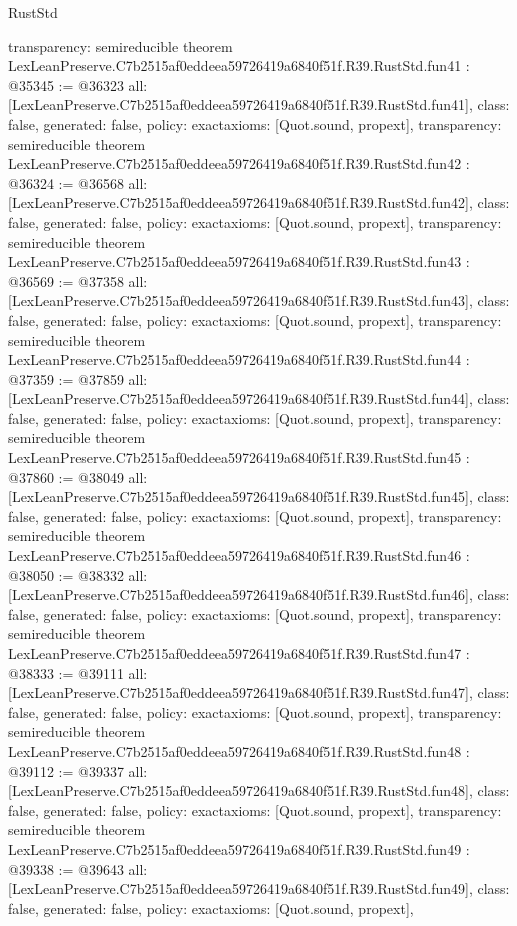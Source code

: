 \begin{lexlean}{RustStd}
\begin{coremodule}
{  transparency: semireducible
}
theorem LexLeanPreserve.C7b2515af0eddeea59726419a6840f51f.R39.RustStd.fun41 : @35345 := @36323 {
  all: [LexLeanPreserve.C7b2515af0eddeea59726419a6840f51f.R39.RustStd.fun41],
  class: false,
  generated: false,
  policy: exact{axioms: [Quot.sound, propext]},
  transparency: semireducible
}
theorem LexLeanPreserve.C7b2515af0eddeea59726419a6840f51f.R39.RustStd.fun42 : @36324 := @36568 {
  all: [LexLeanPreserve.C7b2515af0eddeea59726419a6840f51f.R39.RustStd.fun42],
  class: false,
  generated: false,
  policy: exact{axioms: [Quot.sound, propext]},
  transparency: semireducible
}
theorem LexLeanPreserve.C7b2515af0eddeea59726419a6840f51f.R39.RustStd.fun43 : @36569 := @37358 {
  all: [LexLeanPreserve.C7b2515af0eddeea59726419a6840f51f.R39.RustStd.fun43],
  class: false,
  generated: false,
  policy: exact{axioms: [Quot.sound, propext]},
  transparency: semireducible
}
theorem LexLeanPreserve.C7b2515af0eddeea59726419a6840f51f.R39.RustStd.fun44 : @37359 := @37859 {
  all: [LexLeanPreserve.C7b2515af0eddeea59726419a6840f51f.R39.RustStd.fun44],
  class: false,
  generated: false,
  policy: exact{axioms: [Quot.sound, propext]},
  transparency: semireducible
}
theorem LexLeanPreserve.C7b2515af0eddeea59726419a6840f51f.R39.RustStd.fun45 : @37860 := @38049 {
  all: [LexLeanPreserve.C7b2515af0eddeea59726419a6840f51f.R39.RustStd.fun45],
  class: false,
  generated: false,
  policy: exact{axioms: [Quot.sound, propext]},
  transparency: semireducible
}
theorem LexLeanPreserve.C7b2515af0eddeea59726419a6840f51f.R39.RustStd.fun46 : @38050 := @38332 {
  all: [LexLeanPreserve.C7b2515af0eddeea59726419a6840f51f.R39.RustStd.fun46],
  class: false,
  generated: false,
  policy: exact{axioms: [Quot.sound, propext]},
  transparency: semireducible
}
theorem LexLeanPreserve.C7b2515af0eddeea59726419a6840f51f.R39.RustStd.fun47 : @38333 := @39111 {
  all: [LexLeanPreserve.C7b2515af0eddeea59726419a6840f51f.R39.RustStd.fun47],
  class: false,
  generated: false,
  policy: exact{axioms: [Quot.sound, propext]},
  transparency: semireducible
}
theorem LexLeanPreserve.C7b2515af0eddeea59726419a6840f51f.R39.RustStd.fun48 : @39112 := @39337 {
  all: [LexLeanPreserve.C7b2515af0eddeea59726419a6840f51f.R39.RustStd.fun48],
  class: false,
  generated: false,
  policy: exact{axioms: [Quot.sound, propext]},
  transparency: semireducible
}
theorem LexLeanPreserve.C7b2515af0eddeea59726419a6840f51f.R39.RustStd.fun49 : @39338 := @39643 {
  all: [LexLeanPreserve.C7b2515af0eddeea59726419a6840f51f.R39.RustStd.fun49],
  class: false,
  generated: false,
  policy: exact{axioms: [Quot.sound, propext]},
}
\end{coremodule}
\end{lexlean}

